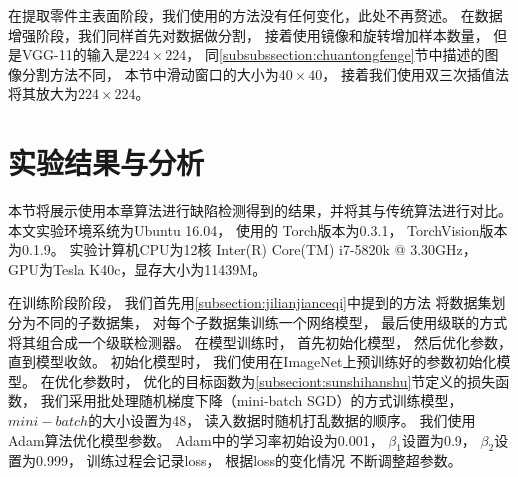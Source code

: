 在提取零件主表面阶段，我们使用的方法没有任何变化，此处不再赘述。
在数据增强阶段，我们同样首先对数据做分割，
接着使用镜像和旋转增加样本数量，
但是VGG-11的输入是$224\times 224$，
同\ref{subsubssection:chuantongfenge}节中描述的图像分割方法不同，
本节中滑动窗口的大小为$40\times 40$，
接着我们使用双三次插值法将其放大为$224\times 224$。


\section{实验结果与分析}

本节将展示使用本章算法进行缺陷检测得到的结果，并将其与传统算法进行对比。
本文实验环境系统为Ubuntu 16.04，
使用的
Torch版本为0.3.1，
TorchVision版本为0.1.9。
实验计算机CPU为12核 Inter(R) Core(TM) i7-5820k @ 3.30GHz，
GPU为Tesla K40c，显存大小为11439M。


在训练阶段阶段，
我们首先用\ref{subsection:jilianjianceqi}中提到的方法
将数据集划分为不同的子数据集，
对每个子数据集训练一个网络模型，
最后使用级联的方式将其组合成一个级联检测器。
在模型训练时，
首先初始化模型，
然后优化参数，
直到模型收敛。
初始化模型时，
我们使用在ImageNet上预训练好的参数初始化模型。
在优化参数时，
优化的目标函数为\ref{subseciont:sunshihanshu}节定义的损失函数，
我们采用批处理随机梯度下降（mini-batch SGD）的方式训练模型，
$mini-batch$的大小设置为48，
读入数据时随机打乱数据的顺序。
我们使用Adam算法优化模型参数。
Adam中的学习率初始设为0.001，
$\beta_1$设置为0.9，
$\beta_2$设置为0.999，
训练过程会记录loss，
根据loss的变化情况
不断调整超参数。

